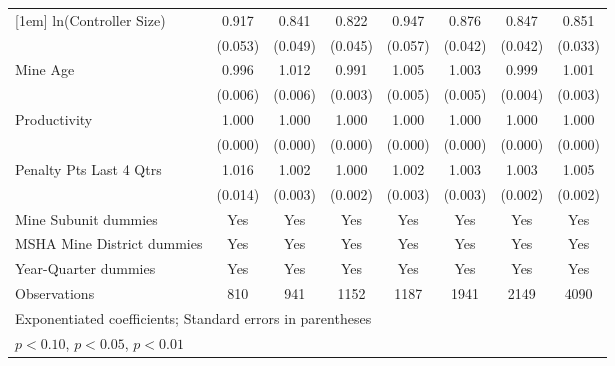 {\begin{tabular}{l*{7}{c}}
[1em]
ln(Controller Size)      &       0.917         &       0.841\sym{***}&       0.822\sym{***}&       0.947         &       0.876\sym{***}&       0.847\sym{***}&       0.851\sym{***}\\
                         &     (0.053)         &     (0.049)         &     (0.045)         &     (0.057)         &     (0.042)         &     (0.042)         &     (0.033)         \\
[1em]
Mine Age                 &       0.996         &       1.012\sym{*}  &       0.991\sym{***}&       1.005         &       1.003         &       0.999         &       1.001         \\
                         &     (0.006)         &     (0.006)         &     (0.003)         &     (0.005)         &     (0.005)         &     (0.004)         &     (0.003)         \\
[1em]
Productivity             &       1.000\sym{*}  &       1.000         &       1.000\sym{***}&       1.000         &       1.000         &       1.000\sym{*}  &       1.000         \\
                         &     (0.000)         &     (0.000)         &     (0.000)         &     (0.000)         &     (0.000)         &     (0.000)         &     (0.000)         \\
[1em]
Penalty Pts Last 4 Qtrs  &       1.016         &       1.002         &       1.000         &       1.002         &       1.003         &       1.003         &       1.005\sym{**} \\
                         &     (0.014)         &     (0.003)         &     (0.002)         &     (0.003)         &     (0.003)         &     (0.002)         &     (0.002)         \\
[1em]
Mine Subunit dummies     &         Yes         &         Yes         &         Yes         &         Yes         &         Yes         &         Yes         &         Yes         \\
[1em]
MSHA Mine District dummies&         Yes         &         Yes         &         Yes         &         Yes         &         Yes         &         Yes         &         Yes         \\
[1em]
Year-Quarter dummies     &         Yes         &         Yes         &         Yes         &         Yes         &         Yes         &         Yes         &         Yes         \\
\hline
Observations             &         810         &         941         &        1152         &        1187         &        1941         &        2149         &        4090         \\
\hline\hline
\multicolumn{8}{l}{\footnotesize Exponentiated coefficients; Standard errors in parentheses}\\
\multicolumn{8}{l}{\footnotesize \sym{*} \(p<0.10\), \sym{**} \(p<0.05\), \sym{***} \(p<0.01\)}\\
\end{tabular}
}
